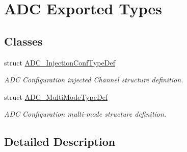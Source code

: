 \hypertarget{group___a_d_c_ex___exported___types}{}\section{A\+DC Exported Types}
\label{group___a_d_c_ex___exported___types}
\subsection*{Classes}
\begin{DoxyCompactItemize}
\item 
struct \hyperlink{struct_a_d_c___injection_conf_type_def}{A\+D\+C\+\_\+\+Injection\+Conf\+Type\+Def}
\begin{DoxyCompactList}\small\item\em A\+DC Configuration injected Channel structure definition. \end{DoxyCompactList}\item 
struct \hyperlink{struct_a_d_c___multi_mode_type_def}{A\+D\+C\+\_\+\+Multi\+Mode\+Type\+Def}
\begin{DoxyCompactList}\small\item\em A\+DC Configuration multi-\/mode structure definition. \end{DoxyCompactList}\end{DoxyCompactItemize}


\subsection{Detailed Description}
